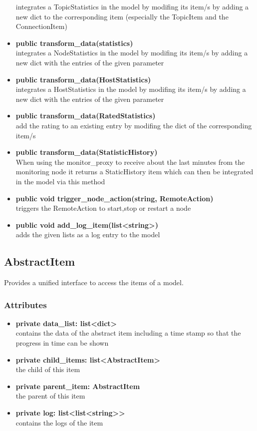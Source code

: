 \begin{itemize}
  integrates a TopicStatistics in the model by modifing its item/s by adding a new dict to the corresponding item (especially the TopicItem and the ConnectionItem)
  \item \textbf{public transform\_data(statistics)}\\ 
  integrates a NodeStatistics in the model by modifing its item/s by adding a new dict with the entries of the given parameter
  \item \textbf{public transform\_data(HostStatistics)}\\ 
  integrates a HostStatistics in the model by modifing its item/s by adding a new dict with the entries of the given parameter
  \item \textbf{public transform\_data(RatedStatistics)}\\ 
  add the rating to an existing entry by modifing the dict of the corresponding
  item/s
  \item \textbf{public transform\_data(StatisticHistory)}\\ 
  When using the monitor\_proxy to receive about the last minutes from the monitoring node
  it returns a StaticHistory item which can then be integrated in the model via this method
  \item \textbf{public void trigger\_node\_action(string, RemoteAction)}\\
  triggers the RemoteAction to start,stop or restart a node
  \item\textbf{public void add\_log\_item(list<string>)}\\
  adds the given lists as a log entry to the model
  \end{itemize}

\subsection{AbstractItem}
Provides a unified interface to access the items of a model.
\subsubsection{Attributes}
\begin{itemize}
  \item \textbf{private data\_list: list<dict>}\\ 
  contains the data of the abstract item including a time stamp so that
  the progress in time can be shown
  \item \textbf{private child\_items: list<AbstractItem>}\\ 
  the child of this item
  \item \textbf{private parent\_item: AbstractItem}\\ 
  the parent of this item
  \item \textbf{private log: list<list<string>>}\\
  contains the logs of the item
\end{itemize}
